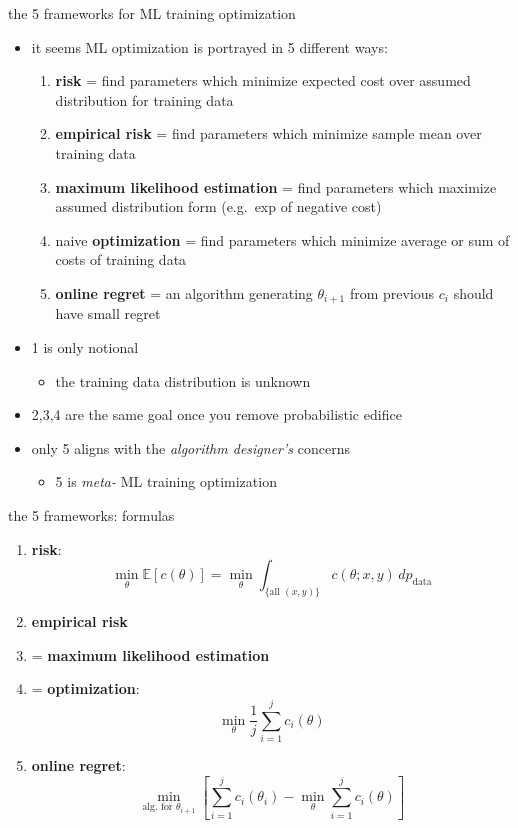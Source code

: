 \documentclass[xcolor={svgnames},
               hyperref={colorlinks,citecolor=DeepPink4,linkcolor=FireBrick,urlcolor=Maroon}]
               {beamer}
\newcommand{\EE}{\mathbb{E}}
\begin{document}
\begin{frame}{the 5 frameworks for ML training optimization}

\begin{itemize}
\item it seems ML optimization is portrayed in 5 different ways:

\medskip
    \begin{enumerate}
    \item[1.] \textbf{risk} = find parameters which minimize expected cost over assumed distribution for training data
    \item[2.] \textbf{empirical risk} = find parameters which minimize sample mean over training data
    \item[3.] \textbf{maximum likelihood estimation} = find parameters which maximize assumed distribution form (e.g.~exp of negative cost)
    \item[4.] naive \textbf{optimization} = find parameters which minimize average or sum of costs of training data
    \item[5.] \textbf{online regret} = an algorithm generating $\theta_{i+1}$ from previous $c_i$ should have small regret
    \end{enumerate}

\bigskip
\item 1 is only notional
    \begin{itemize}
    \item[$-$] the training data distribution is unknown
    \end{itemize}
\item 2,3,4 are the same goal once you remove probabilistic edifice
\item only 5 aligns with the \emph{algorithm designer's} concerns
    \begin{itemize}
    \item[$-$] 5 is \emph{meta-} ML training optimization
    \end{itemize}
\end{itemize}
\end{frame}


\begin{frame}{the 5 frameworks: formulas}

\begin{enumerate}
\item[1.] \textbf{risk}:
    $$\min_\theta \EE[c(\theta)] = \min_\theta \int_{\{\text{all } (x,y)\}} c(\theta;x,y)\,dp_{\text{data}}$$
\item[2.] \textbf{empirical risk}
\item[3.] = \textbf{maximum likelihood estimation}
\item[4.] = \textbf{optimization}:
    $$\min_\theta \frac{1}{j} \sum_{i=1}^j c_i(\theta)$$
\item[5.] \textbf{online regret}:
    $$\min_{\text{alg.~for } \theta_{i+1}} \left[\sum_{i=1}^j c_i(\theta_i) - \min_\theta \sum_{i=1}^j c_i(\theta)\right]$$
\end{enumerate}
\end{frame}
\end{document}
